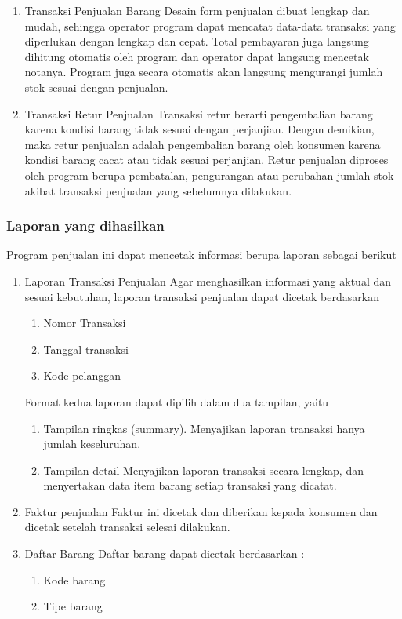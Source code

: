 \documentclass{article}
\begin{document}
\begin{enumerate}
    \item Transaksi Penjualan Barang \newline 
    Desain form penjualan dibuat lengkap dan mudah, sehingga operator program dapat mencatat data-data transaksi yang diperlukan dengan lengkap dan cepat. Total pembayaran juga langsung dihitung otomatis oleh program dan operator dapat langsung mencetak notanya. Program juga secara otomatis akan langsung mengurangi jumlah stok sesuai dengan penjualan.
    \item Transaksi Retur Penjualan \newline 
    Transaksi retur berarti pengembalian barang karena kondisi barang tidak sesuai dengan perjanjian. Dengan demikian, maka retur penjualan adalah pengembalian barang oleh konsumen karena kondisi barang cacat atau tidak sesuai perjanjian. Retur penjualan diproses oleh program berupa pembatalan, pengurangan atau perubahan jumlah stok akibat transaksi penjualan yang sebelumnya dilakukan.
\end{enumerate}

\subsubsection{Laporan yang dihasilkan}
Program penjualan ini dapat mencetak informasi berupa laporan sebagai berikut
\begin{enumerate}
    \item Laporan Transaksi Penjualan \newline
    Agar menghasilkan informasi yang aktual dan sesuai kebutuhan, laporan transaksi penjualan dapat dicetak berdasarkan
    \begin{enumerate}
        \item Nomor Transaksi
        \item Tanggal transaksi
        \item Kode pelanggan
    \end{enumerate}
    Format kedua laporan dapat dipilih dalam dua tampilan, yaitu
    \begin{enumerate}
        \item Tampilan ringkas (summary). \newline
        Menyajikan laporan transaksi hanya jumlah keseluruhan.
        \item Tampilan detail \newline
        Menyajikan laporan transaksi secara lengkap, dan menyertakan  data item barang setiap transaksi yang dicatat.
    \end{enumerate}
    \item Faktur penjualan \newline
    Faktur ini dicetak dan diberikan kepada konsumen dan dicetak setelah transaksi selesai dilakukan.
    \item Daftar Barang \newline
    Daftar barang dapat dicetak berdasarkan :
    \begin{enumerate}
        \item Kode barang
        \item Tipe barang
    \end{enumerate}
\end{enumerate}
\newpage
\end{document}
